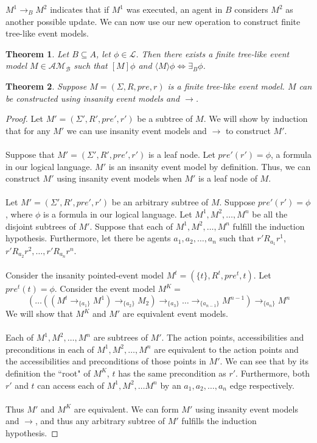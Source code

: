 \documentclass[12pt, a4paper, titlepage]{scrartcl}
\newtheorem{thm}{Theorem}
\begin{document}
$M^1 \to_B M^2$ indicates that if $M^1$ was executed, an agent in $B$ considers $M^2$ as another
possible update.
We can now use our new operation to construct finite tree-like event models.


\begin{thm}
Let $B \subseteq A$, let $\phi \in \mathcal{L}$.
Then there exists a finite tree-like event model $M \in \mathcal{AM_B}$ such that
$[M]\phi$ and $\langle M \rangle \phi \iff \exists_B \phi$.
\end{thm}

\begin{thm}
Suppose $M = (\Sigma, R, pre, r)$ is a finite tree-like event model.
$M$ can be constructed using insanity event models and $\to$.
\end{thm}
\begin{proof}
Let $M' = (\Sigma', R', pre', r')$ be a subtree of $M$.
We will show by induction that for any $M'$ we can use insanity event models and $\to$ to
construct $M'$.\\
\\
Suppose that $M' = (\Sigma', R', pre', r')$ is a leaf node.
Let $pre'(r') = \phi$, a formula in our logical language.
$M'$ is an insanity event model by definition.
Thus, we can construct $M'$ using insanity event models when $M'$ is a leaf node of $M$.\\
\\
Let $M' = (\Sigma', R', pre', r')$ be an arbitrary subtree of $M$.
Suppose $pre'(r') = \phi$, where $\phi$ is a formula in our logical language.
Let $M^1, M^2, \ldots, M^n$ be all the disjoint subtrees of $M'$.
Suppose that each of $M^1, M^2, \ldots, M^n$ fulfill the induction hypothesis.
Furthermore, let there be agents $a_1, a_2, \ldots, a_n$ such that $r' R_{a_1} r^1$, $r' R_{a_2} r^2,
	\ldots, r' R_{a_n} r^n$.\\
\\
Consider the insanity pointed-event model $M^t = (\{ t \}, R^t, pre^t, t)$.
Let $pre^t(t) = \phi$.
Consider the event model $M^K = $
\[
(\ldots((M^t \to_{\{a_1\}} M ^ 1) \to_{\{a_2\}} M_2) \to_{\{a_3\}} \ldots
\to_{\{a_{n-1}\}} M^{n-1} ) \to_{\{a_n\}} M ^ n
\]
We will show that $M^K$ and $M'$ are equivalent event models.\\
\\
Each of $M^1, M^2, \ldots, M^n$ are subtrees of $M'$.
The action points, accessibilities and preconditions in each of $M^1, M^2, \ldots, M^n$ are
equivalent to the action points and the accessibilities and preconditions of those points in $M'$.
We can see that by its definition the ``root" of $M^K$, $t$ has the same precondition as $r'$.
Furthermore, both $r'$ and $t$ can access each of $M^1, M^2, \ldots M^n$ by an $a_1, a_2, \ldots, a_n$ edge
respectively.\\
\\
Thus $M'$ and $M^K$ are equivalent.
We can form $M'$ using insanity event models and $\to$, and thus any arbitrary subtree of $M'$
fulfills the induction hypothesis.
\end{proof}
\end{document}
